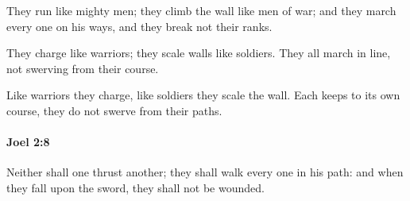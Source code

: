 			\begin{versebox}
					\item[BHS] 
					\item[LXX] 
					\item[ASV] They run like mighty men; they climb the wall like men of war; and they march every one on his ways, and they break not their ranks.
					\item[NIV] They charge like warriors; they scale walls like soldiers. They all march in line, not swerving from their course.
					\item[NRSV] Like warriors they charge, like soldiers they scale the wall. Each keeps to its own course, they do not swerve from their paths.
			\end{versebox}

		\paragraph{Joel 2:8} %
			\label{JOEL-2-8}

			Neither shall one thrust another; they shall walk every one in his path: and when they fall upon the sword, they shall not be wounded.

